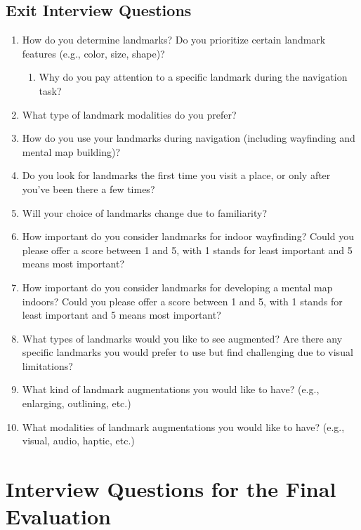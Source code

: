 \subsection{Exit Interview Questions}
\begin{enumerate}
\item How do you determine landmarks? Do you prioritize certain landmark features (e.g., color, size, shape)?
\begin{enumerate}
\item Why do you pay attention to a specific landmark during the navigation task?
\end{enumerate}
\item What type of landmark modalities do you prefer?
\item How do you use your landmarks during navigation (including wayfinding and mental map building)?
\item Do you look for landmarks the first time you visit a place, or only after you’ve been there a few times?
\item Will your choice of landmarks change due to familiarity?
\item How important do you consider landmarks for indoor wayfinding? Could you please offer a score between 1 and 5, with 1 stands for least important and 5 means most important?
\item How important do you consider landmarks for developing a mental map indoors? Could you please offer a score between 1 and 5, with 1 stands for least important and 5 means most important?
\item What types of landmarks would you like to see augmented? Are there any specific landmarks you would prefer to use but find challenging due to visual limitations?
\item What kind of landmark augmentations you would like to have? (e.g., enlarging, outlining, etc.)
\item What modalities of landmark augmentations you would like to have? (e.g., visual, audio, haptic, etc.)
\end{enumerate}


\section{Interview Questions for the Final Evaluation}
\label{Interview Questions for the Evaluation}
